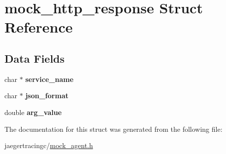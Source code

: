 \hypertarget{structmock__http__response}{}\section{mock\+\_\+http\+\_\+response Struct Reference}
\label{structmock__http__response}
\subsection*{Data Fields}
\begin{DoxyCompactItemize}
\item 
\mbox{\label{structmock__http__response_a1864211ad1d3de9eb43d34094d5b1162}} 
char $\ast$ {\bfseries service\+\_\+name}
\item 
\mbox{\label{structmock__http__response_ac8d4845d80b7503d4441b88f87d23e5b}} 
char $\ast$ {\bfseries json\+\_\+format}
\item 
\mbox{\label{structmock__http__response_a39d6399506c64c42d28a6934b9dda474}} 
double {\bfseries arg\+\_\+value}
\end{DoxyCompactItemize}


The documentation for this struct was generated from the following file\+:\begin{DoxyCompactItemize}
\item 
jaegertracingc/\mbox{\hyperlink{mock__agent_8h}{mock\+\_\+agent.\+h}}\end{DoxyCompactItemize}
